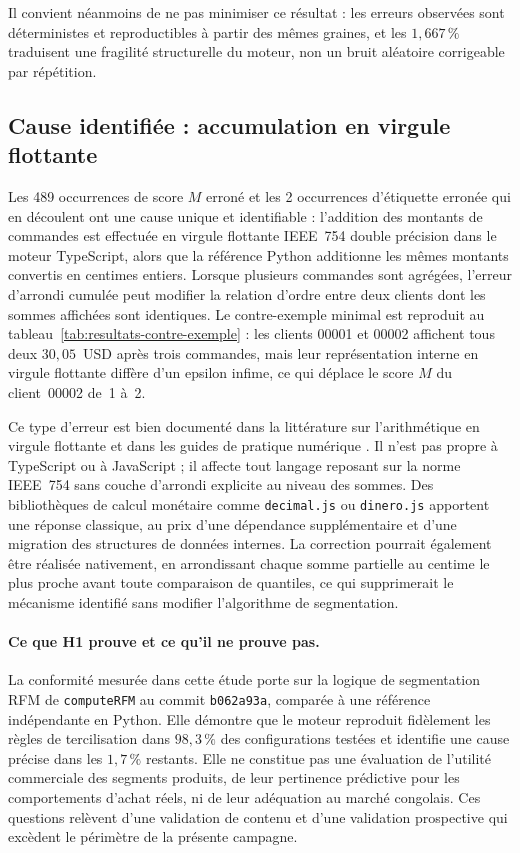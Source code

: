 Il convient néanmoins de ne pas minimiser ce résultat : les erreurs observées sont
déterministes et reproductibles à partir des mêmes graines, et les $1{,}667\,\%$ traduisent
une fragilité structurelle du moteur, non un bruit aléatoire corrigeable par répétition.

\subsection{Cause identifiée : accumulation en virgule flottante}
\label{subsec:disc-h1-cause}

Les 489 occurrences de score $M$ erroné et les 2 occurrences d'étiquette erronée qui en
découlent ont une cause unique et identifiable : l'addition des montants de commandes est
effectuée en virgule flottante IEEE~754 double précision dans le moteur TypeScript, alors que
la référence Python additionne les mêmes montants convertis en centimes entiers. Lorsque
plusieurs commandes sont agrégées, l'erreur d'arrondi cumulée peut modifier la relation
d'ordre entre deux clients dont les sommes affichées sont identiques. Le contre-exemple
minimal est reproduit au tableau~\ref{tab:resultats-contre-exemple} : les clients 00001 et
00002 affichent tous deux $30{,}05$~USD après trois commandes, mais leur représentation
interne en virgule flottante diffère d'un epsilon infime, ce qui déplace le score $M$ du
client~00002 de~1 à~2.

Ce type d'erreur est bien documenté dans la littérature sur l'arithmétique en virgule flottante
\citep{Haissinsky2012} et dans les guides de pratique numérique \citep{Ribatet_nd}. Il n'est
pas propre à TypeScript ou à JavaScript ; il affecte tout langage reposant sur la norme
IEEE~754 sans couche d'arrondi explicite au niveau des sommes. Des bibliothèques de calcul
monétaire comme \texttt{decimal.js} ou \texttt{dinero.js} apportent une réponse classique,
au prix d'une dépendance supplémentaire et d'une migration des structures de données internes.
La correction pourrait également être réalisée nativement, en arrondissant chaque somme
partielle au centime le plus proche avant toute comparaison de quantiles, ce qui supprimerait
le mécanisme identifié sans modifier l'algorithme de segmentation.

\paragraph{Ce que H1 prouve et ce qu'il ne prouve pas.}
La conformité mesurée dans cette étude porte sur la logique de segmentation RFM de
\texttt{computeRFM} au commit \texttt{b062a93a}, comparée à une référence indépendante en
Python. Elle démontre que le moteur reproduit fidèlement les règles de tercilisation dans
$98{,}3\,\%$ des configurations testées et identifie une cause précise dans les $1{,}7\,\%$
restants. Elle ne constitue pas une évaluation de l'utilité commerciale des segments produits,
de leur pertinence prédictive pour les comportements d'achat réels, ni de leur adéquation au
marché congolais. Ces questions relèvent d'une validation de contenu \citep{Salminen2023} et
d'une validation prospective \citep{Fader2005} qui excèdent le périmètre de la présente
campagne.

